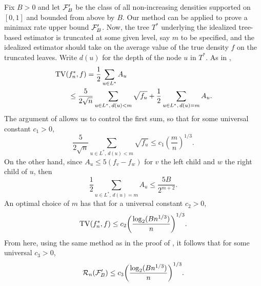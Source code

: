 \begin{rem}
  Fix $B > 0$ and let $\mathcal{F}_B'$ be the class of all non-increasing
  densities supported on $[0, 1]$ and bounded from above by $B$. Our
  method can be applied to prove a minimax rate upper bound
  $\mathcal{F}_B'$. Now, the tree $T^*$ underlying the idealized tree-based
  estimator is truncated at some given level, say $m$ to be specified,
  and the idealized estimator should take on the average value of the
  true density $f$ on the truncated leaves. Write $d(u)$ for the depth
  of the node $u$ in $T^*$. As in ,
  \begin{align*}
    &\TV(f_n^*, f) = \frac{1}{2} \sum_{u \in L^*} A_u \\
    & \qquad\le \frac{5}{2 \sqrt{n}} \sum_{u \in L^*, \, d(u) < m} \sqrt{f_u} + \frac{1}{2} \sum_{u \in L^*, \, d(u) = m} A_u .
  \end{align*}
  The argument of  allows us to control the
  first sum, so that for some universal constant $c_1 > 0$,
  \[
    \frac{5}{2\sqrt{n}} \sum_{u \in L^*, \, d(u) < m} \sqrt{f_u} \le c_1 {\left( \frac{m}{n}\right)}^{1/3} .
  \]
  On the other hand, since $A_u \le 5(f_v - f_w)$ for $v$ the left
  child and $w$ the right child of $u$, then
  \[
    \frac{1}{2} \sum_{u \in L^*, \, d(u) = m} A_u \le \frac{5 B}{2^{m + 2}} .
  \]
  An optimal choice of $m$ has that for a universal constant
  $c_2 > 0$,
  \[
    \TV(f_n^*, f) \le c_2 {\left(\frac{\log_2 (B n^{1/3})}{n}\right)}^{1/3} .
  \]
  From here, using the same method as in the proof of
  , it follows that for some universal
  $c_3 > 0$,
  \[
    \sR_n(\sF_B') \le c_3 {\left(\frac{\log_2 (B
          n^{1/3})}{n}\right)}^{1/3} .
  \]
\end{rem}
